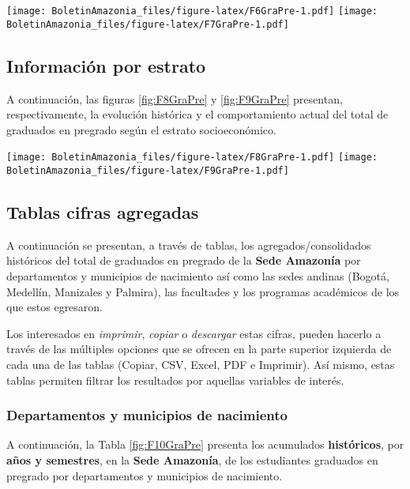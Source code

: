 \documentclass[
]{book}
\begin{document}
\texttt{[image: BoletinAmazonia\_files/figure-latex/F6GraPre-1.pdf]}
\texttt{[image: BoletinAmazonia\_files/figure-latex/F7GraPre-1.pdf]}

\hypertarget{informaciuxf3n-por-estrato-3}{%
\subsection{Información por estrato}\label{informaciuxf3n-por-estrato-3}}

A continuación, las figuras \ref{fig:F8GraPre} y \ref{fig:F9GraPre} presentan, respectivamente, la evolución histórica y el comportamiento actual del total de graduados en pregrado según el estrato socioeconómico.

\texttt{[image: BoletinAmazonia\_files/figure-latex/F8GraPre-1.pdf]}
\texttt{[image: BoletinAmazonia\_files/figure-latex/F9GraPre-1.pdf]}

\hypertarget{tablas-cifras-agregadas-8}{%
\subsection{Tablas cifras agregadas}\label{tablas-cifras-agregadas-8}}

A continuación se presentan, a través de tablas, los agregados/consolidados históricos del total de graduados en pregrado de la \textbf{Sede Amazonía} por departamentos y municipios de nacimiento así como las sedes andinas (Bogotá, Medellín, Manizales y Palmira), las facultades y los programas académicos de los que estos egresaron.

Los interesados en \emph{imprimir}, \emph{copiar} o \emph{descargar} estas cifras, pueden hacerlo a través de las múltiples opciones que se ofrecen en la parte superior izquierda de cada una de las tablas (Copiar, CSV, Excel, PDF e Imprimir). Así mismo, estas tablas permiten filtrar los resultados por aquellas variables de interés.

\hypertarget{departamentos-y-municipios-de-nacimiento}{%
\subsubsection{Departamentos y municipios de nacimiento}\label{departamentos-y-municipios-de-nacimiento}}

A continuación, la Tabla \ref{fig:F10GraPre} presenta los acumulados \textbf{históricos}, por \textbf{años y semestres}, en la \textbf{Sede Amazonía}, de los estudiantes graduados en pregrado por departamentos y municipios de nacimiento.
\end{document}
